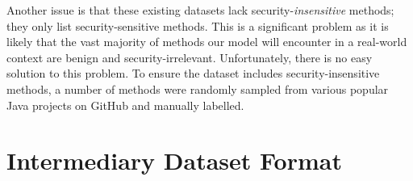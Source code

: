 \noindent
Another issue is that these existing datasets lack security-\emph{insensitive} methods; they only list security-sensitive methods. This is a significant problem as it is likely that the vast majority of methods our model will encounter in a real-world context are benign and security-irrelevant. Unfortunately, there is no easy solution to this problem. To ensure the dataset includes security-insensitive methods, a number of methods were randomly sampled from various popular Java projects on GitHub and manually labelled. 



\section{Intermediary Dataset Format}
\label{intermediary}

